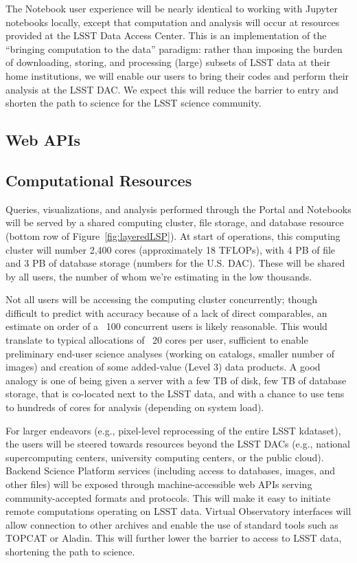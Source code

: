 \documentclass[DM,lsstdraft,toc]{lsstdoc}
\begin{document}
The Notebook user experience will be nearly identical to working with Jupyter 
notebooks locally, except that computation and analysis will occur at resources 
provided at the LSST Data Access Center.  This is an implementation of the 
“bringing computation to the data” paradigm: rather than imposing the burden of 
downloading, storing, and processing (large) subsets of LSST data at their home 
institutions, we will enable our users to bring their codes and perform their 
analysis at the LSST DAC.  We expect this will reduce the barrier to entry and 
shorten the path to science for the LSST science community.

\subsection{Web APIs}

\subsection{Computational Resources}
Queries, visualizations, and analysis performed through the Portal and Notebooks 
will be served by a shared computing cluster, file storage, and database 
resource (bottom row of Figure~\ref{fig:layeredLSP}).  At start of operations, 
this computing cluster will number 2,400 cores (approximately 18 TFLOPs), with 4 
PB of file and 3 PB of database storage (numbers for the U.S.  DAC). These will 
be shared by all users, the number of whom we’re estimating in the low 
thousands.

Not all users will be accessing the computing cluster concurrently; though 
difficult to predict with accuracy because of a lack of direct comparables, an 
estimate on order of a ~100 concurrent users is likely reasonable.  This would 
translate to typical allocations of ~20 cores per user, sufficient to enable 
preliminary end-user science analyses (working on catalogs, smaller number of 
images) and creation of some added-value (Level 3) data products. A good analogy 
is one of being given a server with a few TB of disk, few TB of database 
storage, that is co-located next to the LSST data, and with a chance to use tens 
to hundreds of cores for analysis (depending on system load).

For larger endeavors (e.g., pixel-level reprocessing of the entire LSST 
kdataset), the users will be steered towards resources beyond the LSST DACs 
(e.g., national supercomputing centers, university computing centers, or the 
public cloud).  Backend Science Platform services (including access to 
databases, images, and other files) will be exposed through machine-accessible 
web APIs serving community-accepted formats and protocols.  This will make it 
easy to initiate remote computations operating on LSST data.  Virtual 
Observatory interfaces will allow connection to other archives and enable the 
use of standard tools such as TOPCAT or Aladin. This will further lower the 
barrier to access to LSST data, shortening the path to science.
\end{document}
